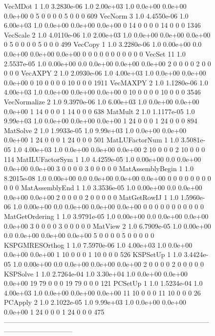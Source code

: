 {{\begin{figure}[H]
{\begin{outputlisting}[\fontsize{7.5pt}{8pt}\ttfamily]
VecMDot                1 1.0 3.2830e-06 1.0 2.00e+03 1.0 0.0e+00 0.0e+00 0.0e+00  0  5  0  0  0   0  5  0  0  0   609
VecNorm                3 1.0 4.4550e-06 1.0 6.00e+03 1.0 0.0e+00 0.0e+00 0.0e+00  0 14  0  0  0   0 14  0  0  0  1346
VecScale               2 1.0 4.0110e-06 1.0 2.00e+03 1.0 0.0e+00 0.0e+00 0.0e+00  0  5  0  0  0   0  5  0  0  0   499
VecCopy                1 1.0 3.2280e-06 1.0 0.00e+00 0.0 0.0e+00 0.0e+00 0.0e+00  0  0  0  0  0   0  0  0  0  0     0
VecSet                11 1.0 2.5537e-05 1.0 0.00e+00 0.0 0.0e+00 0.0e+00 0.0e+00  2  0  0  0  0   2  0  0  0  0     0
VecAXPY                2 1.0 2.0930e-06 1.0 4.00e+03 1.0 0.0e+00 0.0e+00 0.0e+00  0 10  0  0  0   0 10  0  0  0  1911
VecMAXPY               2 1.0 1.1280e-06 1.0 4.00e+03 1.0 0.0e+00 0.0e+00 0.0e+00  0 10  0  0  0   0 10  0  0  0  3546
VecNormalize           2 1.0 9.3970e-06 1.0 6.00e+03 1.0 0.0e+00 0.0e+00 0.0e+00  1 14  0  0  0   1 14  0  0  0   638
MatMult                2 1.0 1.1177e-05 1.0 9.99e+03 1.0 0.0e+00 0.0e+00 0.0e+00  1 24  0  0  0   1 24  0  0  0   894
MatSolve               2 1.0 1.9933e-05 1.0 9.99e+03 1.0 0.0e+00 0.0e+00 0.0e+00  1 24  0  0  0   1 24  0  0  0   501
MatLUFactorNum         1 1.0 3.5081e-05 1.0 4.00e+03 1.0 0.0e+00 0.0e+00 0.0e+00  2 10  0  0  0   2 10  0  0  0   114
MatILUFactorSym        1 1.0 4.4259e-05 1.0 0.00e+00 0.0 0.0e+00 0.0e+00 0.0e+00  3  0  0  0  0   3  0  0  0  0     0
MatAssemblyBegin       1 1.0 8.2015e-08 1.0 0.00e+00 0.0 0.0e+00 0.0e+00 0.0e+00  0  0  0  0  0   0  0  0  0  0     0
MatAssemblyEnd         1 1.0 3.3536e-05 1.0 0.00e+00 0.0 0.0e+00 0.0e+00 0.0e+00  2  0  0  0  0   2  0  0  0  0     0
MatGetRowIJ            1 1.0 1.5960e-06 1.0 0.00e+00 0.0 0.0e+00 0.0e+00 0.0e+00  0  0  0  0  0   0  0  0  0  0     0
MatGetOrdering         1 1.0 3.9791e-05 1.0 0.00e+00 0.0 0.0e+00 0.0e+00 0.0e+00  3  0  0  0  0   3  0  0  0  0     0
MatView                2 1.0 6.7909e-05 1.0 0.00e+00 0.0 0.0e+00 0.0e+00 0.0e+00  5  0  0  0  0   5  0  0  0  0     0
KSPGMRESOrthog         1 1.0 7.5970e-06 1.0 4.00e+03 1.0 0.0e+00 0.0e+00 0.0e+00  1 10  0  0  0   1 10  0  0  0   526
KSPSetUp               1 1.0 3.4424e-05 1.0 0.00e+00 0.0 0.0e+00 0.0e+00 0.0e+00  2  0  0  0  0   2  0  0  0  0     0
KSPSolve               1 1.0 2.7264e-04 1.0 3.30e+04 1.0 0.0e+00 0.0e+00 0.0e+00 19 79  0  0  0  19 79  0  0  0   121
PCSetUp                1 1.0 1.5234e-04 1.0 4.00e+03 1.0 0.0e+00 0.0e+00 0.0e+00 11 10  0  0  0  11 10  0  0  0    26
PCApply                2 1.0 2.1022e-05 1.0 9.99e+03 1.0 0.0e+00 0.0e+00 0.0e+00  1 24  0  0  0   1 24  0  0  0   475
------------------------------------------------------------------------------------------------------------------------


\end{outputlisting}}
\end{figure}}}
